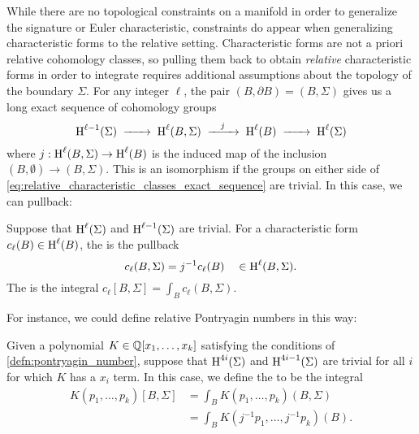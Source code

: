 While there are no topological constraints on a manifold in order to generalize the signature or Euler characteristic, constraints do appear when generalizing characteristic forms to the relative setting.
Characteristic forms are not a priori relative cohomology classes, so pulling them back to obtain \emph{relative} characteristic forms in order to integrate requires additional assumptions about the topology of the boundary $\Sigma$.
For any integer $\ell$, the pair $(B, \partial B) = (B, \Sigma)$ gives us a long exact sequence of cohomology groups
\begin{equation}\label{eq:relative_characteristic_classes_exact_sequence}
	\H^{\ell-1}(\Sigma) \lkxto \H^{\ell}(B, \Sigma) \lkxto[j] \H^{\ell}(B) \lkxto \H^{\ell}(\Sigma)
\end{equation}
where $j : \operatorname{H}^{\ell}(B, \Sigma) \to \operatorname{H}^{\ell}(B)$ is the induced map of the inclusion $(B,\emptyset) \to (B, \Sigma)$. This is an isomorphism if the groups on either side of \cref{eq:relative_characteristic_classes_exact_sequence} are trivial. In this case, we can pullback:

\begin{definition}\label{defn:relative_characteristic_form}
	Suppose that $\operatorname{H}^{\ell}(\Sigma)$ and $\operatorname{H}^{\ell-1}(\Sigma)$ are trivial. For a characteristic form $c_\ell(B) \in \operatorname{H}^{\ell}(B)$, the  is the pullback
	\[
		c_\ell(B, \Sigma) = j^{-1} c_\ell(B) \quad\in \operatorname{H}^{\ell}(B, \Sigma).
	\]
	The  is the integral $c_\ell[B,\Sigma]=\int_B c_\ell(B,\Sigma)$.
\end{definition}

For instance, we could define relative Pontryagin numbers in this way:

\begin{definition}\label{defn:relative_pontryagin_number}
	Given a polynomial $K\in \mathbb{Q}[x_1,\ldots, x_k]$ satisfying the conditions of \cref{defn:pontryagin_number}, suppose that $\operatorname{H}^{4i}(\Sigma)$ and $\operatorname{H}^{4i-1}(\Sigma)$ are trivial for all $i$ for which $K$ has a $x_i$ term.
	In this case, we define the  to be the integral
	\[
		\begin{aligned}
			K(p_1, \ldots, p_k)[B,\Sigma]
			 & = \int_B K(p_1, \ldots, p_k)(B,\Sigma)       \\
			 & = \int_B K(j^{-1}p_1, \ldots, j^{-1}p_k)(B).
		\end{aligned}
	\]
\end{definition}

